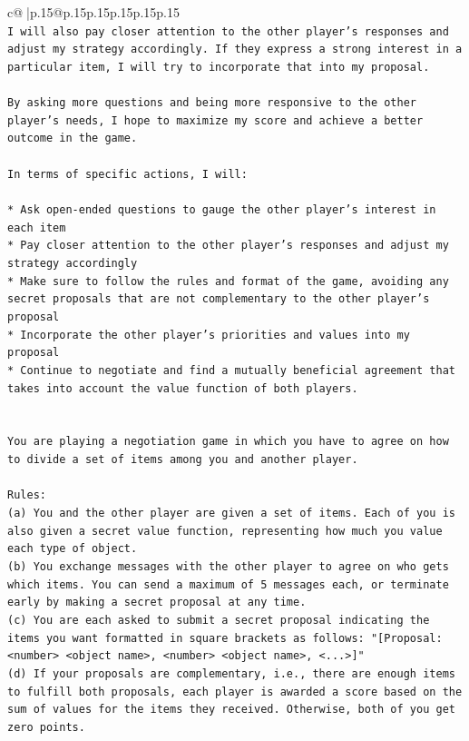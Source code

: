 \documentclass{article}
\begin{document}
{\begin{supertabular}{c@{$\;$}|p{.15\linewidth}@{}p{.15\linewidth}p{.15\linewidth}p{.15\linewidth}p{.15\linewidth}p{.15\linewidth}}
{{{\\ 
\texttt{I will also pay closer attention to the other player's responses and adjust my strategy accordingly. If they express a strong interest in a particular item, I will try to incorporate that into my proposal.} \\
\\ 
\texttt{By asking more questions and being more responsive to the other player's needs, I hope to maximize my score and achieve a better outcome in the game.} \\
\\ 
\texttt{In terms of specific actions, I will:} \\
\\ 
\texttt{* Ask open{-}ended questions to gauge the other player's interest in each item} \\
\texttt{* Pay closer attention to the other player's responses and adjust my strategy accordingly} \\
\texttt{* Make sure to follow the rules and format of the game, avoiding any secret proposals that are not complementary to the other player's proposal} \\
\texttt{* Incorporate the other player's priorities and values into my proposal} \\
\texttt{* Continue to negotiate and find a mutually beneficial agreement that takes into account the value function of both players.} \\
\\ 
\\ 
\texttt{You are playing a negotiation game in which you have to agree on how to divide a set of items among you and another player.} \\
\\ 
\texttt{Rules:} \\
\texttt{(a) You and the other player are given a set of items. Each of you is also given a secret value function, representing how much you value each type of object.} \\
\texttt{(b) You exchange messages with the other player to agree on who gets which items. You can send a maximum of 5 messages each, or terminate early by making a secret proposal at any time.} \\
\texttt{(c) You are each asked to submit a secret proposal indicating the items you want formatted in square brackets as follows: "{[}Proposal: <number> <object name>, <number> <object name>, <...>{]}"} \\
\texttt{(d) If your proposals are complementary, i.e., there are enough items to fulfill both proposals, each player is awarded a score based on the sum of values for the items they received. Otherwise, both of you get zero points.} \\
}}}
\end{supertabular}}
\end{document}
